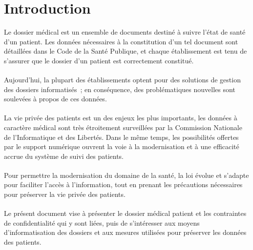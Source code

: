     \section*{Introduction}

\paragraph{}
Le dossier médical est un ensemble de documents destiné à suivre l'état de
santé d'un patient. Les données nécessaires à la constitution d'un tel document
sont détaillées dans le Code de la Santé Publique, et chaque établissement est
tenu de s'assurer que le dossier d'un patient est correctement constitué.

\paragraph{}
Aujourd'hui, la plupart des établissements optent pour des solutions de gestion
des dossiers informatisés~; en conséquence, des problématiques nouvelles sont
soulevées à propos de ces données.

\paragraph{}
La vie privée des patients est un des enjeux les plus importants, les données à
caractère médical sont très étroitement surveillées par la Commission Nationale
de l'Informatique et des Libertés. Dans le même temps, les possibilités
offertes par le support numérique ouvrent la voie à la modernisation et à une
efficacité accrue du système de suivi des patients.

\paragraph{}
Pour permettre la modernisation du domaine de la santé, la loi évolue et
s'adapte pour faciliter l'accès à l'information, tout en prenant les
précautions nécessaires pour préserver la vie privée des patients.

\paragraph{}
Le présent document vise à présenter le dossier médical patient et les
contraintes de confidentialité qui y sont liées, puis de s'intéresser aux
moyens d'informatisation des dossiers et aux mesures utilisées pour préserver
les données des patients.
